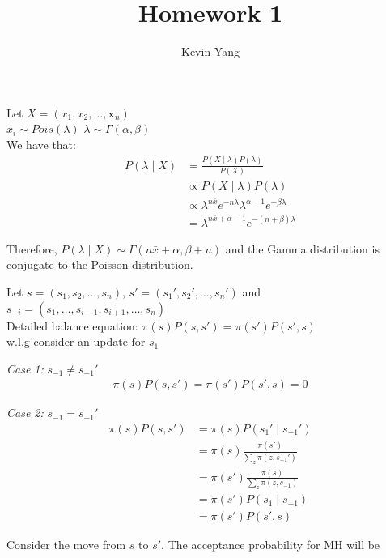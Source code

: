\documentclass[10pt]{homeworg}
\title{Homework 1}
\author{Kevin Yang}
\begin{document}
\maketitle

\exercise
Let $X = (x_1, x_2, \ldots, \boldsymbol x_n)$ \\
\vspace{0.5cm}
$x_i \sim Pois(\lambda)$  \hspace{2cm} $\lambda \sim \Gamma(\alpha, \beta)$
\\
We have that:
\begin{align*}
P(\lambda \mid X) &= \frac{P(X \mid \lambda)P(\lambda)}{P(X)}\\
				  &\propto P(X \mid \lambda)P(\lambda)\\
				  &\propto \lambda^{n\bar{x}}e^{-n\lambda}\lambda^{\alpha-1}e^{-\beta\lambda}\\
				  &= \lambda^{n\bar{x}+\alpha-1}e^{-(n+\beta)\lambda}
\end{align*}

Therefore, $P(\lambda \mid X) \sim \Gamma(n\bar{x}+\alpha, \beta+n)$ and the Gamma distribution is conjugate to the Poisson distribution.

\exercise
Let $s = (s_1, s_2, \ldots, s_n)$, $s' = (s_1', s_2', \ldots, s_n')$ and $s_{-i} = (s_1, \ldots, s_{i-1}, s_{i+1}, \ldots, s_n)$\\
Detailed balance equation: $\pi(s)P(s,s')=\pi(s')P(s',s)$\\

w.l.g consider an update for $s_1$\\
\vspace{0.5cm}

\textit{Case 1:} $s_{-1} \neq s_{-1}'$
\begin{align*}
\pi(s)P(s,s') = \pi(s')P(s',s) = 0
\end{align*}


\textit{Case 2:} $s_{-1} = s_{-1}'$
\begin{align*}
\pi(s)P(s,s') &= \pi(s)P(s_1' \mid s_{-1}')\\
			  &= \pi(s)\frac{\pi(s')}{\sum_z \pi(z, s_{-1}')}\\
			  &= \pi(s')\frac{\pi(s)}{\sum_z \pi(z, s_{-1})}\\
			  &= \pi(s')P(s_1 \mid s_{-1})\\
			  &= \pi(s')P(s',s)
\end{align*}

Consider the move from $s$ to $s'$. The acceptance probability for MH will be
\end{document}
